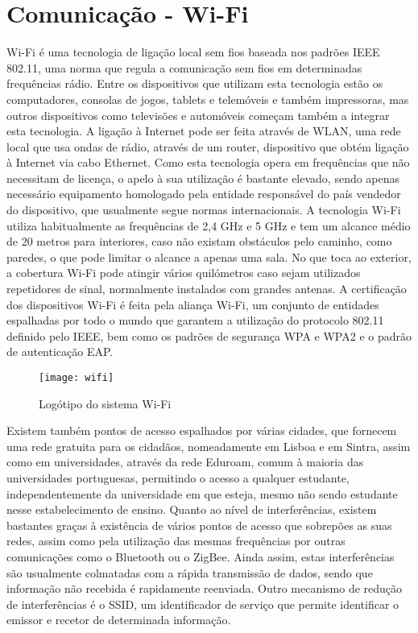 \section{Comunicação - Wi-Fi}
\label{sec:wi-fi}

Wi-Fi é uma tecnologia de ligação local sem fios baseada nos padrões IEEE 802.11, uma norma que regula a comunicação sem fios em determinadas frequências rádio.
Entre os dispositivos que utilizam esta tecnologia estão os computadores, consolas de jogos, tablets e telemóveis e também impressoras, mas outros dispositivos como televisões e automóveis começam também a integrar esta tecnologia.
A ligação à Internet pode ser feita através de WLAN, uma rede local que usa ondas de rádio, através de um router, dispositivo que obtém ligação à Internet via cabo Ethernet.
Como esta tecnologia opera em frequências que não necessitam de licença, o apelo à sua utilização é bastante elevado, sendo apenas necessário equipamento homologado pela entidade responsável do país vendedor do dispositivo, que usualmente segue normas internacionais.
A tecnologia Wi-Fi utiliza habitualmente as frequências de 2,4 GHz e 5 GHz e tem um alcance médio de 20 metros para interiores, caso não existam obstáculos pelo caminho, como paredes, o que pode limitar o alcance a apenas uma sala.
No que toca ao exterior, a cobertura Wi-Fi pode atingir vários quilómetros caso sejam utilizados repetidores de sinal, normalmente instalados com grandes antenas.
A certificação dos dispositivos Wi-Fi é feita pela aliança Wi-Fi, um conjunto de entidades espalhadas por todo o mundo que garantem a utilização do protocolo 802.11 definido pelo IEEE, bem como os padrões de segurança WPA e WPA2 e o padrão de autenticação EAP.

\begin{figure}[hbtp]
	\centering
	\texttt{[image: wifi]}
	\caption[Logótipo do sistema Wi-Fi]{Logótipo do sistema Wi-Fi \footnotemark}
	\label{fig:arduino}
\end{figure}

Existem também pontos de acesso espalhados por várias cidades, que fornecem uma rede gratuita para os cidadãos, nomeadamente em Lisboa e em Sintra, assim como em universidades, através da rede Eduroam, comum à maioria das universidades portuguesas, permitindo o acesso a qualquer estudante, independentemente da universidade em que esteja, mesmo não sendo estudante nesse estabelecimento de ensino.
Quanto ao nível de interferências, existem bastantes graças à existência de vários pontos de acesso que sobrepões as suas redes, assim como pela utilização das mesmas frequências por outras comunicações como o Bluetooth ou o ZigBee.
Ainda assim, estas interferências são usualmente colmatadas com a rápida transmissão de dados, sendo que informação não recebida é rapidamente reenviada.
Outro mecanismo de redução de interferências é o SSID, um identificador de serviço que permite identificar o emissor e recetor de determinada informação.

